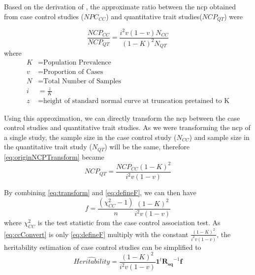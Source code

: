 			Based on the derivation of \citet{Yang2010}, the approximate ratio between the \gls{ncp} obtained from case control studies ($NPC_{CC}$) and quantitative trait studies($NCP_{QT}$) were
		
			\begin{equation}
			\frac{NCP_{CC}}{NCP_{QT}} = \frac{i^2v(1-v)N_{CC}}{(1-K)^2N_{QT}}
			\label{eq:originNCPTransform}
			\end{equation}
			where
			\begin{align*}
			 K &= \text{Population Prevalence} \\
			 v &= \text{Proportion of Cases}\\
			 N &= \text{Total Number of Samples}\\
			 i &= \frac{z}{K}\\
			 z &= \text{height of standard normal curve at truncation pretained to K}
			\end{align*}
			
			Using this approximation, we can directly transform the \gls{ncp} between the case control studies and quantitative trait studies.
			As we were transforming the \gls{ncp} of a single study, the sample size in the case control study ($N_{CC}$) and sample size in the quantitative trait study ($N_{QT}$) will be the same, therefore \cref{eq:originNCPTransform} became
			\begin{equation}
			NCP_{QT} = \frac{NCP_{CC}(1-K)^2}{i^2v(1-v)}
			\label{eq:transform}
			\end{equation}
			
			By combining \cref{eq:transform} and \cref{eq:defineF}, we can then have
			\begin{equation}
			f = \frac{(\chi^2_{CC}-1)}{n}\frac{(1-K)^2}{i^2v(1-v)}
			\label{eq:ccConvert}
			\end{equation}
			where $\chi^2_{CC}$ is the test statistic from the case control association test.
			As \cref{eq:ccConvert} is only \cref{eq:defineF} multiply with the constant $\frac{(1-K)^2}{i^2v(1-v)}$, the heritability estimation of case control studies can be simplified to 
			\begin{equation}
			\hat{Heritability} =\frac{(1-K)^2}{i^2v(1-v)} \boldsymbol{1}^t\boldsymbol{R_{sq}}^{-1}\boldsymbol{f}
			\label{eq:caseControlHerit}
			\end{equation}
			
